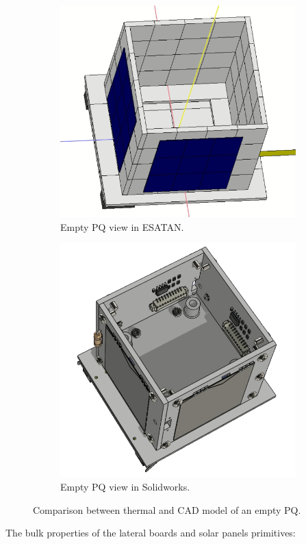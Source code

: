 \begin{figure}[H]
  \centering
  \begin{subfigure}{.5\textwidth}
    \centering
    \includegraphics[width=.6\linewidth]{res/img/5_simulationanalisys/Comparisons/ESATAN/laterals_top.PNG}
    \caption{Empty PQ view in ESATAN.}
    \label{fig:emptypq}
  \end{subfigure}%
  \begin{subfigure}{.5\textwidth}
    \centering
    \includegraphics[width=.5\linewidth]{res/img/5_simulationanalisys/Comparisons/SLDW/PQtoplat_Solid.PNG}
    \caption{Empty PQ view in Solidworks.}
    \label{fig:emptypqsolid}
  \end{subfigure}
  \caption{Comparison between thermal and CAD model of an empty PQ.}
  \label{fig:emptypqim}
\end{figure}

The bulk properties of the lateral boards and solar panels primitives:

